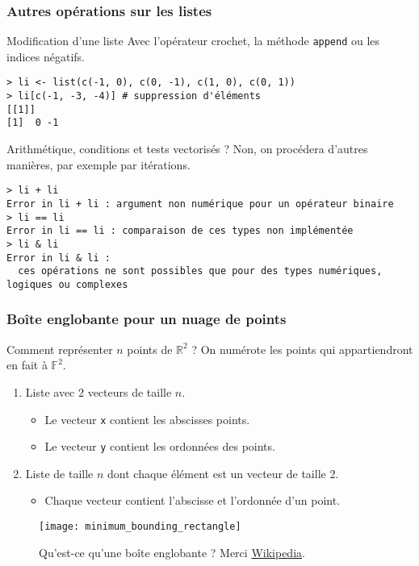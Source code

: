 \documentclass[10pt]{beamer}
\begin{document}
\begin{frame}[fragile]
  \frametitle{Autres opérations sur les listes}

  \begin{block}{Modification d'une liste}
    Avec l'opérateur crochet, la méthode \texttt{append} ou les indices négatifs.
  \begin{lstlisting}[style=block]
> li <- list(c(-1, 0), c(0, -1), c(1, 0), c(0, 1))
> li[c(-1, -3, -4)] # suppression d'éléments
[[1]]
[1]  0 -1
\end{lstlisting}
\end{block}


  \begin{block}{Arithmétique, conditions et tests vectorisés ? }
    Non, on procédera d'autres manières, par exemple par itérations.
    \begin{lstlisting}
> li + li
Error in li + li : argument non numérique pour un opérateur binaire
> li == li
Error in li == li : comparaison de ces types non implémentée
> li & li
Error in li & li :
  ces opérations ne sont possibles que pour des types numériques, logiques ou complexes
\end{lstlisting}

\end{block}

\end{frame}



\begin{frame}[fragile]
  \frametitle{Boîte englobante pour un nuage de points}
    \begin{block}{Comment représenter $n$ points de $\mathbb{R}^2$ ?}
      On numérote les points qui appartiendront en fait à $\mathbb{F}^2$.
      \begin{enumerate}
    \item Liste avec 2 vecteurs de taille $n$.
      \begin{itemize}
      \item Le vecteur \texttt{x} contient les abscisses points.
      \item Le vecteur \texttt{y} contient les ordonnées des points.
      \end{itemize}
    \item Liste de taille $n$ dont chaque élément est un vecteur de taille 2.
      \begin{itemize}
      \item Chaque vecteur contient l'abscisse et l'ordonnée d'un point.
      \end{itemize}
    \end{enumerate}
  \end{block}

  \begin{figure}[htbp]
    \centering
    \texttt{[image: minimum\_bounding\_rectangle]}
    \caption{Qu'est-ce qu'une boîte englobante ? Merci \href{https://en.wikipedia.org/wiki/Minimum_bounding_box}{Wikipedia}.}
  \end{figure}
\end{frame}
\end{document}
